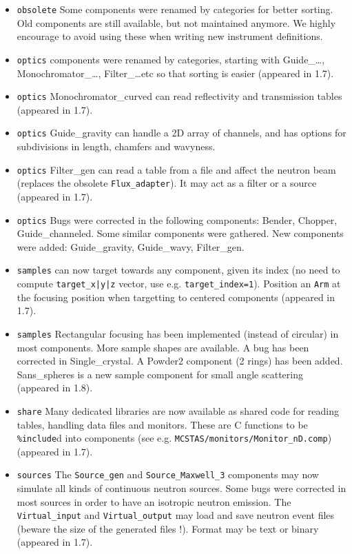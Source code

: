 \begin{itemize}
\item \texttt{obsolete} Some components were renamed by categories for better sorting. Old components are still available, but not maintained anymore. We highly encourage to avoid using these when writing new instrument definitions. 
\item \texttt{optics} components were renamed by categories, starting with
   Guide\_\ldots, Monochromator\_\ldots, Filter\_\ldots etc so that sorting is
   easier (appeared in 1.7). 
\item \texttt{optics} Monochromator\_curved can read reflectivity and transmission tables (appeared in 1.7).   
\item \texttt{optics} Guide\_gravity can handle a 2D array of channels, and
    has options for subdivisions in length, chamfers and wavyness.
\item \texttt{optics} Filter\_gen can read a table from a file and affect the neutron
    beam (replaces the obsolete \verb+Flux_adapter+). It may act as a filter or a
    source (appeared in 1.7).    
\item \texttt{optics} Bugs were corrected in the following components: Bender, Chopper, Guide\_channeled. Some similar components were gathered. New components were added: Guide\_gravity, Guide\_wavy, Filter\_gen. 
\item \texttt{samples} can now target towards any component, given its index 
    (no need to compute \verb+target_x|y|z+ vector, use e.g. \verb+target_index=1+). 
    Position an \verb+Arm+ at the focusing position when targetting to 
    centered components (appeared in 1.7). 
\item \texttt{samples} Rectangular focusing has been implemented (instead of circular) in most components. More sample shapes are available. A bug has been corrected in Single\_crystal. A Powder2 component (2 rings) has been added. Sans\_spheres is a new sample component for small angle scattering (appeared in 1.8). 
\item \texttt{share} Many dedicated libraries are now available as shared code for reading tables,
    handling data files and monitors. These are C functions to be \texttt{\%include}d
    into components (see e.g. \verb+MCSTAS/monitors/Monitor_nD.comp+) (appeared in 1.7).
\item \texttt{sources} The \verb+Source_gen+ and \verb+Source_Maxwell_3+ components may now simulate all kinds of continuous neutron sources. Some bugs were corrected in most sources in order to have an isotropic neutron emission. The \verb+Virtual_input+ and \verb+Virtual_output+ may load and save neutron event files (beware the size of the generated files !). Format may be text or binary (appeared in 1.7). 
\end{itemize}

